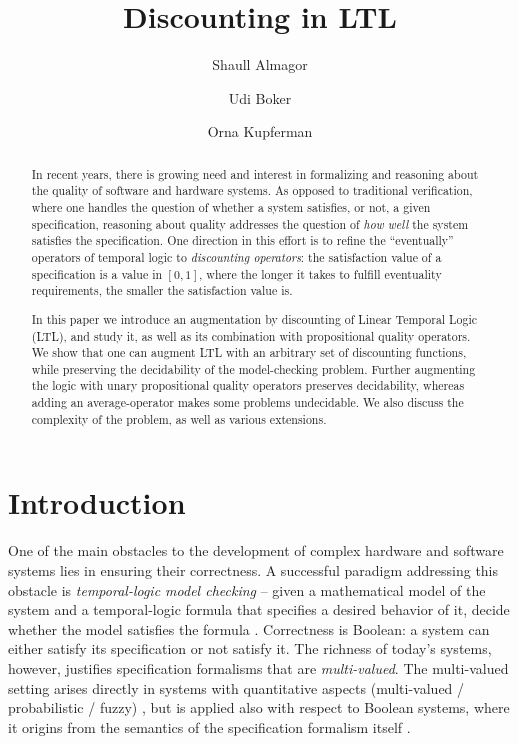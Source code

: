 \documentclass{llncs}
\begin{document}
\belowdisplayskip=3pt
\abovedisplayskip=3pt
\title{Discounting in LTL}
\author{Shaull Almagor \and Udi Boker \and Orna Kupferman}
\maketitle

\begin{abstract}
In recent years, there is growing need and interest in formalizing and reasoning about the quality of software and hardware systems. As opposed to traditional verification, where one handles the question of whether a system satisfies, or not, a given specification, reasoning about quality addresses the question of \emph{how well} the system satisfies the specification. One direction in this effort is to refine the ``eventually'' operators of temporal logic to {\em discounting operators}: the satisfaction value of a specification is a value in $[0,1]$, where the longer it takes to fulfill eventuality requirements, the smaller the satisfaction value is.

In this paper we introduce an augmentation by discounting of Linear Temporal Logic (LTL), and study it, as well as its combination with propositional quality operators. We show that one can augment LTL with an arbitrary set of discounting functions, while preserving the decidability of the model-checking problem. Further augmenting the logic with unary propositional quality operators preserves decidability, whereas adding an average-operator makes some problems undecidable.
We also discuss the complexity of the problem, as well as various extensions.
\end{abstract}



\section{Introduction}
\label{sec:introduction}
One of the main obstacles to the development of complex hardware and software systems lies in ensuring their correctness. A successful paradigm addressing this obstacle is {\em temporal-logic model checking\/} -- given a mathematical model of the system and a temporal-logic formula that specifies a desired behavior of it, decide whether the model satisfies the formula \cite{CGP99}.
Correctness is Boolean: a system can
either satisfy its specification or not satisfy it. The richness
of today's systems, however, justifies specification formalisms that
are {\em multi-valued}. The multi-valued setting arises directly in systems
with quantitative aspects (multi-valued / probabilistic / fuzzy) \cite{DR09b,DV12,FLS08,Kwi07,MLL04}, but is applied also with respect to Boolean systems, where it origins from the semantics of the specification formalism itself 
\cite{ABK13,AFHMS05}.
\end{document}
